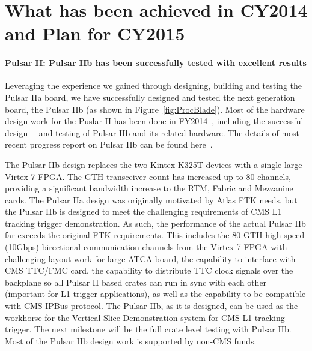 \section{What has been achieved in CY2014 and Plan for CY2015}


\paragraph{Pulsar II:  Pulsar IIb has been successfully tested with excellent results}

Leveraging the experience we gained through designing, building and testing the Pulsar IIa board, we have successfully designed and tested the next generation board, the Pulsar IIb (as shown in Figure~\ref{fig:ProcBlade}).
Most of the hardware design work for the Puslar II has been done in FY2014~\cite{bib:PulsarII}, including the successful design~\cite{bib:PulsarII-results}~\cite{bib:PulsarII-weblink} and testing of Pulsar IIb and its related hardware. 
The details of most recent progress report on Pulsar IIb can be found here~\cite{bib:joint-meeting}.

  The Pulsar IIb design replaces the two Kintex K325T devices with a single large Virtex-7 FPGA.  The GTH transceiver count has increased up to 80 channels, providing a significant bandwidth increase to the RTM, Fabric and Mezzanine cards. The Pulsar IIa design was originally motivated by Atlas FTK needs, but the Pulsar IIb is designed to meet the challenging requirements of CMS L1 tracking trigger demonstration. As such, the performance of the actual Pulsar IIb far exceeds the original FTK requirements. 
This includes the 80 GTH high speed (10Gbps) birectional communication channels from the Virtex-7 FPGA with challenging layout work for large ATCA board, the capability to interface with CMS TTC/FMC card, the capability to distribute TTC clock signals over the backplane so all Pulsar II based crates can run in sync with each other (important for L1 trigger applications), as well as the capability to be compatible with CMS IPBus protocol. The Pulsar IIb, as it is designed, can be used as the workhorse for the Vertical Slice Demonstration system for CMS L1 tracking trigger. The next milestone will be the full crate level testing with Pulsar IIb. Most of the Pulsar IIb design work is supported by non-CMS funds.


